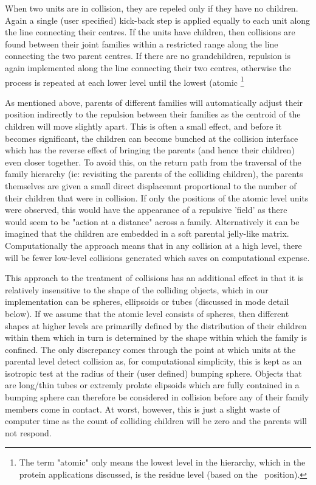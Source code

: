 When two units are in collision, they are repeled only if they have no
children.  Again a single (user specified) kick-back step is applied
equally to each unit along the line connecting their centres.
If the units have children, then collisions are found between their
joint families within a restricted range along the line connecting the
two parent centres.  If there are no grandchildren, repulsion is again
implemented along the line connecting their two centres, otherwise the
process is repeated at each lower level until the lowest (atomic
\footnote{The term "atomic" only means the lowest level in the 
hierarchy, which in the protein applications discussed, is the
residue level (based on the \CA\ position).}

As mentioned above, parents of different families will automatically
adjust their position indirectly to the repulsion between their families
as the centroid of the children will move slightly apart.   This is 
often a small effect, and before it becomes significant, the children 
can become bunched at the collision interface which has the reverse
effect of bringing the parents (and hence their children) even closer
together.   To avoid this, on the return path from the traversal of the
family hierarchy (ie: revisiting the parents of the colliding children),
the parents themselves are given a small direct displacemnt proportional
to the number of their children that were in collision.   If only the 
positions of the atomic level units were observed, this would have the
appearance of a repulsive 'field'  as there would seem to be "action
at a distance" across a family.  Alternatively it can be imagined that
the children are embedded in a soft parental jelly-like matrix.
Computationally the approach means that in any collision at a high
level, there will be fewer low-level collisions generated which saves
on computational expense.

This approach to the treatment of collisions has an additional effect
in that it is relatively insensitive to the shape of the colliding
objects, which in our implementation can be spheres,
ellipsoids or tubes (discussed in mode detail below).  If we assume
that the atomic level consists of spheres, then different shapes at 
higher levels are primarilly defined by the distribution of their
children within them which in turn is determined by the shape within
which the family is confined.  The only discrepancy comes through
the point at which units at the parental level detect collision as,
for computational simplicity, this is kept as an isotropic test at the
radius of their (user defined) bumping sphere.   Objects that are
long/thin tubes or extremly prolate elipsoids which are fully contained
in a bumping sphere can therefore be considered in collision before
any of their family members come in contact.  At worst, however, this
is just a slight waste of computer time as the count of colliding
children will be zero and the parents will not respond.

